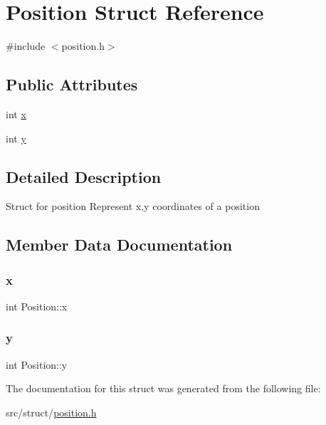 \hypertarget{struct_position}{}\section{Position Struct Reference}
\label{struct_position}


{\ttfamily \#include $<$position.\+h$>$}

\subsection*{Public Attributes}
\begin{DoxyCompactItemize}
\item 
int \mbox{\hyperlink{struct_position_aeda152ffeee17ae5be9c02327b2408d8}{x}}
\item 
int \mbox{\hyperlink{struct_position_a3c08e9213d4726b21caba3073192c4a3}{y}}
\end{DoxyCompactItemize}


\subsection{Detailed Description}
Struct for position Represent x,y coordinates of a position 

\subsection{Member Data Documentation}
\mbox{\label{struct_position_aeda152ffeee17ae5be9c02327b2408d8}} 
\subsubsection{\texorpdfstring{x}{x}}
{\footnotesize\ttfamily int Position\+::x}

\mbox{\label{struct_position_a3c08e9213d4726b21caba3073192c4a3}} 
\subsubsection{\texorpdfstring{y}{y}}
{\footnotesize\ttfamily int Position\+::y}



The documentation for this struct was generated from the following file\+:\begin{DoxyCompactItemize}
\item 
src/struct/\mbox{\hyperlink{position_8h}{position.\+h}}\end{DoxyCompactItemize}
